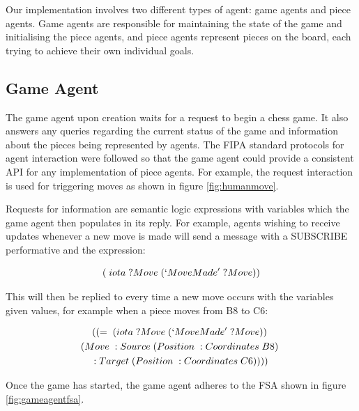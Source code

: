 \documentclass{article}
\begin{document}
Our implementation involves two different types of agent: game agents and piece agents. Game agents are responsible for maintaining the state of the game and initialising the piece agents, and piece agents represent pieces on the board, each trying to achieve their own individual goals.

\subsection{Game Agent}

The game agent upon creation waits for a request to begin a chess game. It also answers any queries regarding the current status of the game and information about the pieces being represented by agents. The FIPA standard protocols for agent interaction \cite{fipaprotocols} were followed so that the game agent could provide a consistent API for any implementation of piece agents. For example, the request interaction is used for triggering moves as shown in figure \ref{fig:humanmove}. 

Requests for information are semantic logic expressions with variables which the game agent then populates in its reply. For example, agents wishing to receive updates whenever a new move is made will send a message with a SUBSCRIBE performative and the expression:

\begin{equation} \label{eq:movesubscribe}
	(\;iota\; ?Move\; (`Move Made'\; ?Move))	
\end{equation}

This will then be replied to every time a new move occurs with the variables given values, for example when a piece moves from B8 to C6:

\begin{multline} \label{eq:movesubscriberesponse}
	((=\; (iota\; ?Move\; (`Move Made'\; ?Move))\;  \\
	(Move\; :Source\; (Position\; :Coordinates\; B8)\; \\
	:Target\; (Position\; :Coordinates\; C6))))
\end{multline}

Once the game has started, the game agent adheres to the FSA shown in figure \ref{fig:gameagentfsa}. 
\end{document}
